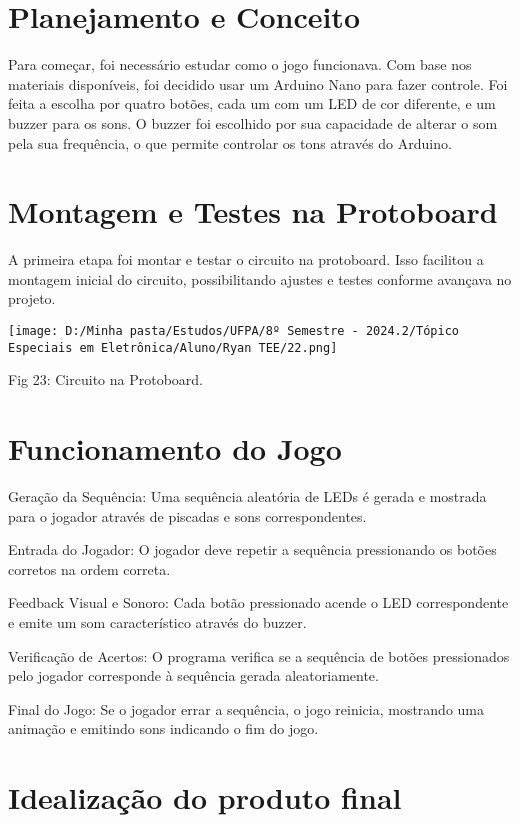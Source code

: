 \documentclass[
]{book}
\begin{document}
\section{Planejamento e Conceito}\label{planejamento-e-conceito}

Para começar, foi necessário estudar como o jogo funcionava. Com base nos materiais disponíveis, foi decidido usar um Arduino Nano para fazer controle. Foi feita a escolha por quatro botões, cada um com um LED de cor diferente, e um buzzer para os sons. O buzzer foi escolhido por sua capacidade de alterar o som pela sua frequência, o que permite controlar os tons através do Arduino.

\section{Montagem e Testes na Protoboard}\label{montagem-e-testes-na-protoboard}

A primeira etapa foi montar e testar o circuito na protoboard. Isso facilitou a montagem inicial do circuito, possibilitando ajustes e testes conforme avançava no projeto.

\texttt{[image: D:/Minha pasta/Estudos/UFPA/8º Semestre - 2024.2/Tópico Especiais em Eletrônica/Aluno/Ryan TEE/22.png]}

Fig 23: Circuito na Protoboard.

\section{Funcionamento do Jogo}\label{funcionamento-do-jogo}

Geração da Sequência: Uma sequência aleatória de LEDs é gerada e mostrada para o jogador através de piscadas e sons correspondentes.

Entrada do Jogador: O jogador deve repetir a sequência pressionando os botões corretos na ordem correta.

Feedback Visual e Sonoro: Cada botão pressionado acende o LED correspondente e emite um som característico através do buzzer.

Verificação de Acertos: O programa verifica se a sequência de botões pressionados pelo jogador corresponde à sequência gerada aleatoriamente.

Final do Jogo: Se o jogador errar a sequência, o jogo reinicia, mostrando uma animação e emitindo sons indicando o fim do jogo.

\section{Idealização do produto final}\label{idealizauxe7uxe3o-do-produto-final}
\end{document}
